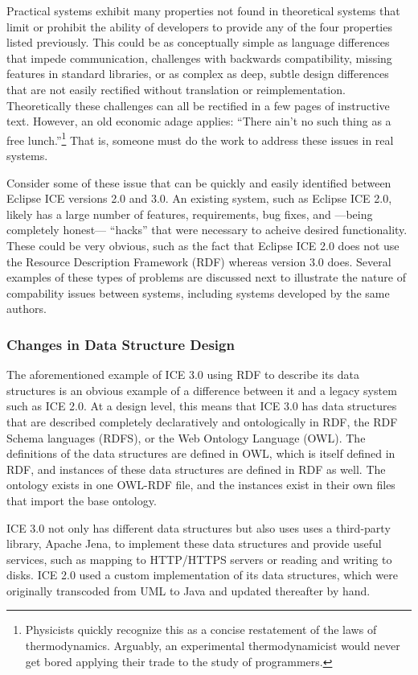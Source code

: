 Practical systems exhibit many properties not found in theoretical systems that
limit or prohibit the ability of developers to provide any of the four
properties listed previously. This could be as conceptually simple as language
differences that impede communication, challenges with backwards compatibility,
missing features in standard libraries, or as complex as deep, subtle design
differences that are not easily rectified without translation or
reimplementation. Theoretically these challenges can all be rectified in a few
pages of instructive text. However, an old economic adage applies:
``There ain't no such thing as a free lunch.''\footnote{Physicists quickly recognize this as a concise
restatement of the laws of thermodynamics. Arguably, an experimental
thermodynamicist would never get bored applying their trade to the study of
programmers.} That is, someone must do the work to address these issues in real
systems.

Consider some of these issue that can be quickly and easily identified between
Eclipse ICE versions 2.0 and 3.0. An existing system, such as Eclipse ICE 2.0,
likely has a large number of features, requirements, bug fixes, and ---being completely
honest--- ``hacks'' that were necessary to acheive desired functionality. These
could be very obvious, such as the fact that Eclipse ICE 2.0 does not use the Resource
Description Framework (RDF) whereas version 3.0 does. Several examples of these
types of problems are discussed next to illustrate the nature of
compability issues between systems, including systems developed by the same authors.

\subsubsection{Changes in Data Structure Design}

The aforementioned example of ICE 3.0 using RDF to describe its data structures
is an obvious example of a difference between it and a legacy system such as ICE
2.0. At a design level, this means that ICE 3.0 has data structures that are
described completely declaratively and ontologically in RDF, the RDF Schema
languages (RDFS), or the Web Ontology Language (OWL). The definitions of the
data structures are defined in OWL, which is itself defined in RDF, and
instances of these data structures are defined in RDF as well. The ontology
exists in one OWL-RDF file, and the instances exist in their own files that
import the base ontology.

ICE 3.0 not only has different data structures but also uses uses a third-party
library, Apache Jena, to implement these data structures and provide useful
services, such as mapping to HTTP/HTTPS servers or reading and writing to
disks. ICE 2.0 used a custom implementation of its data structures, which were
originally transcoded from UML to Java and updated thereafter by hand.

